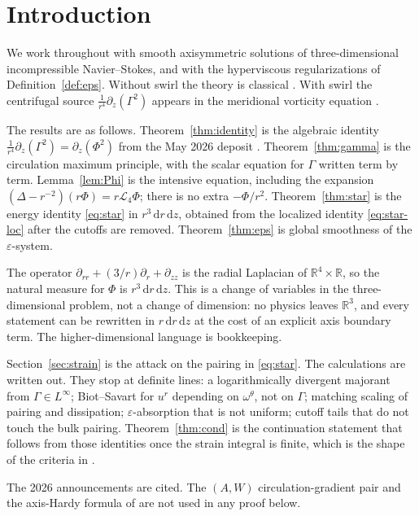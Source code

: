 \documentclass[11pt]{article}
\theoremstyle{definition}
\newcommand{\eps}{\varepsilon}
\newcommand{\R}{\mathbb{R}}
\newcommand{\dd}{\mathrm{d}}
\newcommand{\ur}{u^{r}}
\newcommand{\Ph}{\Phi}
\newcommand{\Ga}{\Gamma}
\newcommand{\Lfour}{\mathcal{L}_{4}}
\newcommand{\Lint}{L^{\infty}}
\begin{document}
\section{Introduction}

We work throughout with smooth axisymmetric solutions of
three-dimensional incompressible Navier--Stokes, and with the
hyperviscous regularizations of Definition~\ref{def:eps}.
Without swirl the theory is classical
\cite{Lady1968,UY1968}.
With swirl the centrifugal source
\(\frac1{r^4}\partial_z(\Ga^2)\)
appears in the meridional vorticity equation
\cite{Danchin2007,CSTY2008,CSTY2009,LeiZhang2011}.

The results are as follows.
Theorem~\ref{thm:identity} is the algebraic identity
\(\frac1{r^4}\partial_z(\Ga^2)=\partial_z(\Ph^2)\)
from the May 2026 deposit
\cite{SimonsPhi2026,SimonsPhiShort2026}.
Theorem~\ref{thm:gamma} is the circulation maximum principle, with the
scalar equation for \(\Ga\) written term by term.
Lemma~\ref{lem:Phi} is the intensive equation, including the expansion
\((\Delta-r^{-2})(r\Ph)=r\Lfour\Ph\); there is no extra \(-\Ph/r^2\).
Theorem~\ref{thm:star} is the energy identity \eqref{eq:star} in
\(r^3\,\dd r\,\dd z\), obtained from the localized identity
\eqref{eq:star-loc} after the cutoffs are removed.
Theorem~\ref{thm:eps} is global smoothness of the \(\eps\)-system.

The operator \(\partial_{rr}+(3/r)\partial_r+\partial_{zz}\) is the radial
Laplacian of \(\R^4\times\R\), so the natural measure for \(\Ph\) is
\(r^3\,\dd r\,\dd z\). This is a change of variables in the
three-dimensional problem, not a change of dimension: no physics leaves
\(\R^3\), and every statement can be rewritten in \(r\,\dd r\,\dd z\)
at the cost of an explicit axis boundary term. The higher-dimensional
language is bookkeeping.

Section~\ref{sec:strain} is the attack on the pairing in \eqref{eq:star}.
The calculations are written out. They stop at definite lines: a
logarithmically divergent majorant from \(\Ga\in\Lint\); Biot--Savart
for \(\ur\) depending on \(\omega^\theta\), not on \(\Ga\); matching
scaling of pairing and dissipation; \(\eps\)-absorption that is not
uniform; cutoff tails that do not touch the bulk pairing.
Theorem~\ref{thm:cond} is the continuation statement that follows from
those identities once the strain integral is finite, which is the
shape of the criteria in
\cite{CSTY2008,CSTY2009,ChenFangZhang2017}.

The 2026 announcements \cite{ShahApr,ShahMay,ShahJun} are cited.
The \((A,W)\) circulation-gradient pair and the axis-Hardy formula of
\cite{ShahJun} are not used in any proof below.
\end{document}
